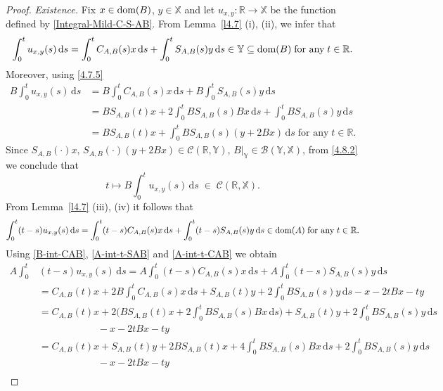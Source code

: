 \documentclass[11pt]{amsart}
\numberwithin{equation}{section}
\newcommand{\SAB}{S_{A,B}}
\newcommand{\CAB}{C_{A,B}}
\newcommand{\rmd}{{\mathrm{d}}}
\theoremstyle{remark}
\theoremstyle{definition}
\newcommand\bX{{\mathbb X}}
\newcommand\bY{{\mathbb Y}}
\newcommand{\dom}{\text{\rm{dom}}}
\begin{document}
\begin{proof} \textit{Existence.} Fix $x \in \dom(B)$, $y \in \bX$ and let $u_{x,y} : \mathbb{R} \to \bX$ be the function defined by \eqref{Integral-Mild-C-S-AB}. From Lemma~\ref{l4.7} (i), (ii), we infer that
	\begin{equation}\label{4.8.1}
		\int_0^t u_{x,y}(s)\,\rmd s
		= \int_0^t \CAB(s)x\,\rmd s
		+\int_0^t \SAB(s)y\,\rmd s
		\in \bY \subseteq \dom(B)\;\text{for any}\; t \in \mathbb{R}.
	\end{equation}
	Moreover, using \eqref{4.7.5}
	\begin{align}\label{4.8.2}
		B\int_0^t u_{x,y}(s)\,\rmd s
		&= B\int_0^t \CAB(s)x\,\rmd s + B\int_0^t \SAB(s)y\,\rmd s\nonumber\\
		&= B\SAB(t)x + 2\int_0^t B\SAB(s)Bx\,\rmd s
		+ \int_0^t B\SAB(s)y\,\rmd s\nonumber\\
		&= B\SAB(t)x + \int_0^t B\SAB(s)(y + 2Bx)\,\rmd s
		\; \text{for any}\; t \in \mathbb{R}.
	\end{align}
	Since $\SAB(\cdot)x,\, \SAB(\cdot)(y+2Bx) \in \mathcal{C}(\mathbb{R},\bY)$, $B|_\bY \in \mathcal{B}(\bY,\bX)$, from \eqref{4.8.2} we conclude that
	\begin{equation}\label{4.8.3}
		t \mapsto B\int_0^t u_{x,y}(s)\,\rmd s \;\in\; \mathcal{C}(\mathbb{R}, \bX).
	\end{equation}
	From Lemma~\ref{l4.7} (iii), (iv) it follows that
	\begin{equation}\label{4.8.4}
		\int_0^t (t-s)u_{x,y}(s)\,\rmd s
		=\int_0^t (t-s)\CAB(s)x\,\rmd s
		+ \int_0^t (t-s)\SAB(s)y\,\rmd s
		\in \dom(A)\; \text{for any}\; t \in \mathbb{R}.
	\end{equation}
	Using \eqref{B-int-CAB}, \eqref{A-int-t-SAB} and \eqref{A-int-t-CAB} we obtain
	\begin{align}\label{4.8.5}
		A\int_0^t &(t-s)u_{x,y}(s)\,\rmd s
		= A\int_0^t (t-s)\CAB(s)x\,\rmd s + A\int_0^t (t-s)\SAB(s)y\,\rmd s\nonumber\\
		&= \CAB(t)x + 2B\int_0^t \CAB(s)x\,\rmd s + \SAB(t)y + 2\int_0^t B\SAB(s)y\,\rmd s - x - 2tBx - ty\nonumber\\
		&= \CAB(t)x + 2\Big(B\SAB(t)x+2\int_0^t B\SAB(s)Bx\,\rmd s \Big)+ \SAB(t)y + 2\int_0^t B\SAB(s)y\,\rmd s\nonumber\\
		&\qquad\qquad\qquad - x - 2tBx - ty\nonumber\\
		&=\CAB(t)x+\SAB(t)y+2B\SAB(t)x+4\int_0^t B\SAB(s)Bx\,\rmd s+2\int_0^t B\SAB(s)y\,\rmd s\nonumber\\
		&\qquad\qquad\qquad - x - 2tBx - ty\nonumber\\

\end{align}
\end{proof}
\end{document}
